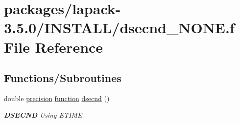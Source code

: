 \hypertarget{dsecnd__NONE_8f}{}\section{packages/lapack-\/3.5.0/\+I\+N\+S\+T\+A\+L\+L/dsecnd\+\_\+\+N\+O\+N\+E.f File Reference}
\label{dsecnd__NONE_8f}
\subsection*{Functions/\+Subroutines}
\begin{DoxyCompactItemize}
\item 
double \hyperlink{numinquire_8h_a2c8e616467665d0b2814d4c1589ba74e}{precision} \hyperlink{afunc_8m_a7b5e596df91eadea6c537c0825e894a7}{function} \hyperlink{group__auxOTHERauxiliary_gafe21a6b76340ac0afd7f0f84326e7918}{dsecnd} ()
\begin{DoxyCompactList}\small\item\em {\bfseries D\+S\+E\+C\+N\+D} Using E\+T\+I\+M\+E \end{DoxyCompactList}\end{DoxyCompactItemize}
